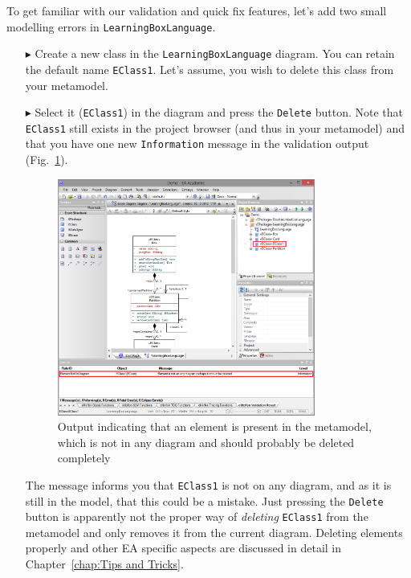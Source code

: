 To get familiar with our validation and quick fix features, let's add two small modelling errors in \texttt{LearningBoxLanguage}.

\begin{enumerate}
\item[$\blacktriangleright$] Create a new class in the \texttt{Learning\-Box\-Language} diagram.
You can retain the default name \texttt{EClass1}.
Let's assume, you wish to delete this class from your metamodel.
\item[$\blacktriangleright$] Select it (\texttt{EClass1}) in the diagram and press the \texttt{Delete} button.
Note that \texttt{EClass1} still exists in the project browser (and thus in your metamodel) and that you have one new \texttt{Information} message in the validation output (Fig.~\ref{fig:validation_information}).

\begin{figure}[htbp]
	\centering
  \includegraphics[width=0.8\textwidth]{pics/memBoxBilder/memBox43}
	\caption{Output indicating that an element is present in the metamodel, which is not in any diagram and should probably be deleted completely}
	\label{fig:validation_information}
\end{figure}

The message informs you that \texttt{EClass1} is not on any diagram, and as it is still in the model, that this could be a mistake.
Just pressing the \texttt{Delete} button is apparently not the proper way of \emph{deleting} \texttt{EClass1} from the metamodel and only removes it from the current diagram.
Deleting elements properly and other EA specific aspects are discussed in detail in Chapter~\ref{chap:Tips and Tricks}.



\end{enumerate}
